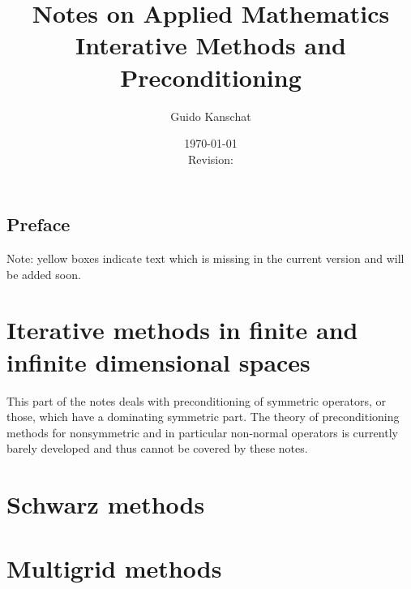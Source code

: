 \documentclass[USenglish,limits]{report}
\title{\textbf{Notes on Applied Mathematics}
\\[5mm]
{\large Interative Methods and Preconditioning}}
\author{Guido Kanschat}
\date{\today\\[5mm]Revision: \svnrev}
\begin{document}
\maketitle

\section*{Preface}


\begin{todo}
  Note: yellow boxes indicate text which is missing in the current
  version and will be added soon.
\end{todo}

\tableofcontents

\chapter{Iterative methods in finite and infinite dimensional spaces}

\begin{remark}
  This part of the notes deals with preconditioning of symmetric
  operators, or those, which have a dominating symmetric part. The
  theory of preconditioning methods for nonsymmetric and in particular
  non-normal operators is currently barely developed and thus cannot
  be covered by these notes. 
\end{remark}




\chapter{Schwarz methods}


\chapter{Multigrid methods}


\printbibliography
\printindex
\end{document}
